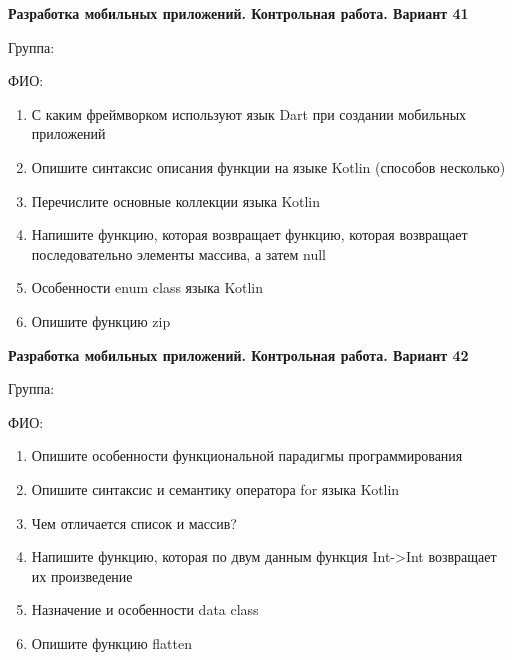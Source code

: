 \documentclass[12pt]{article}
\begin{document}
\newpage\begin{minipage}{\textwidth}
\textbf{Разработка мобильных приложений. Контрольная работа. Вариант 41}

Группа: \underline{\hspace{3cm}}

ФИО: \underline{\hspace{10cm}}

\begin{enumerate}
\item С каким фреймворком используют язык Dart при создании мобильных приложений
\item Опишите синтаксис описания функции на языке Kotlin (способов несколько)
\item Перечислите основные коллекции языка Kotlin
\item Напишите функцию, которая возвращает функцию, которая возвращает последовательно элементы массива, а затем null
\item Особенности enum class языка Kotlin
\item Опишите функцию zip

\end{enumerate}
\end{minipage}

\newpage\begin{minipage}{\textwidth}
\textbf{Разработка мобильных приложений. Контрольная работа. Вариант 42}

Группа: \underline{\hspace{3cm}}

ФИО: \underline{\hspace{10cm}}

\begin{enumerate}
\item Опишите особенности функциональной парадигмы программирования
\item Опишите синтаксис и семантику оператора for языка Kotlin
\item Чем отличается список и массив?
\item Напишите функцию, которая по двум данным функция Int->Int возвращает их произведение
\item Назначение и особенности data class
\item Опишите функцию flatten

\end{enumerate}
\end{minipage}
\end{document}
